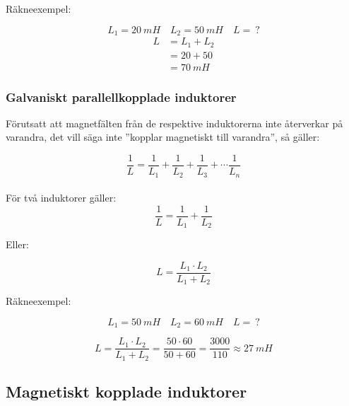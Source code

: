 \noindent Räkneexempel:

\[L_1 = 20\ mH \quad L_2 = 50\ mH \quad L =\ ?\]
\begin{align*}
  L &= L_1 + L_2 \\
    & = 20 + 50 \\
    &= 70\ mH
\end{align*}

\subsubsection{Galvaniskt parallellkopplade induktorer}

Förutsatt att magnetfälten från de respektive induktorerna inte återverkar på
varandra, det vill säga inte ''kopplar magnetiskt till varandra'', så gäller:

\[
\frac{1}{L} = \frac{1}{L_1} + \frac{1}{L_2} + \frac{1}{L_3} +
\cdots \frac{1}{L_n}
\]\\[0.25\baselineskip]


För två induktorer gäller:
\[  \frac{1}{L} = \frac{1}{L_1} + \frac{1}{L_2} \]

Eller:

\[ L = \frac{L_1 \cdot L_2}{L_1 + L_2} \]

\noindent Räkneexempel:

\[ L_1 = \SI{50}{mH} \quad L_2 = \SI{60}{mH} \quad L =\ ?   \]

\[ L = \frac{L_1 \cdot L_2}{L_1 + L_2} = \frac{50 \cdot 60}{50 + 60} =
\frac{3000}{110} \approx \SI{27}{mH} \]


\subsection{Magnetiskt kopplade induktorer}

